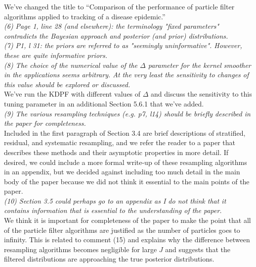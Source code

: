 \documentclass{article}
\begin{document}
We've changed the title to ``Comparison of the performance of particle filter algorithms applied to tracking of a disease epidemic.'' \\

\noindent \emph{(6) Page 1, line 28 (and elsewhere): the terminology "fixed parameters" contradicts the Bayesian approach and posterior (and prior) distributions.} \\

\noindent \emph{(7) P1, l 31: the priors are referred to as "seemingly uninformative". However, these are quite informative priors.} \\

\noindent \emph{(8) The choice of the numerical value of the $\Delta$ parameter for the kernel smoother in the applications seems arbitrary. At the very least the sensitivity to changes of this value should be explored or discussed.} \\

We've run the KDPF with different values of $\Delta$ and discuss the sensitivity to this tuning parameter in an additional Section 5.6.1 that we've added. \\

\noindent \emph{(9) The various resampling techniques (e.g. p7, l14) should be briefly described in the paper for completeness.} \\

Included in the first paragraph of Section 3.4 are brief descriptions of stratified, residual, and systematic resampling, and we refer the reader to a paper that describes these methods and their asymptotic properties in more detail. If desired, we could include a more formal write-up of these resampling algorithms in an appendix, but we decided against including too much detail in the main body of the paper because we did not think it essential to the main points of the paper. \\

\noindent \emph{(10) Section 3.5 could perhaps go to an appendix as I do not think that it contains information that is essential to the understanding of the paper.} \\

We think it is important for completeness of the paper to make the point that all of the particle filter algorithms are justified as the number of particles goes to infinity. This is related to comment (15) and explains why the difference between resampling algorithms becomes negligible for large $J$ and suggests that the filtered distributions are approaching the true posterior distributions. \\
\end{document}
